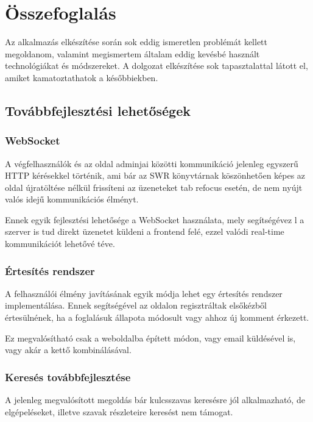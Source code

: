 \chapter{Összefoglalás}

Az alkalmazás elkészítése során sok eddig ismeretlen problémát kellett megoldanom, valamint megismertem
általam eddig kevésbé használt technológiákat és módszereket. A dolgozat elkészítése sok tapasztalattal látott
el, amiket kamatoztathatok a későbbiekben.

\section{Továbbfejlesztési lehetőségek}

\subsection{WebSocket}

A végfelhasználók és az oldal adminjai közötti kommunikáció jelenleg egyszerű HTTP kérésekkel történik,
ami bár az SWR könyvtárnak köszönhetően képes az oldal újratöltése nélkül frissíteni az üzeneteket tab refocus esetén,
de nem nyújt valós idejű kommunikációs élményt.

Ennek egyik fejlesztési lehetősége a WebSocket használata, mely segítségévez l a szerver is tud direkt
üzenetet küldeni a frontend felé, ezzel valódi real-time kommunikációt lehetővé téve.

\subsection{Értesítés rendszer}

A felhasználói élmény javításának egyik módja lehet egy értesítés rendszer implementálása. Ennek segítségével
az oldalon regisztráltak elsőkézből értesülnének, ha a foglalásuk állapota módosult vagy ahhoz új komment érkezett.

Ez megvalósítható csak a weboldalba épített módon, vagy email küldésével is, vagy akár a kettő kombinálásával.

\subsection{Keresés továbbfejlesztése}

A jelenleg megvalósított megoldás bár kulcsszavas keresésre jól alkalmazható, de elgépeléseket, illetve
szavak részleteire keresést nem támogat.

